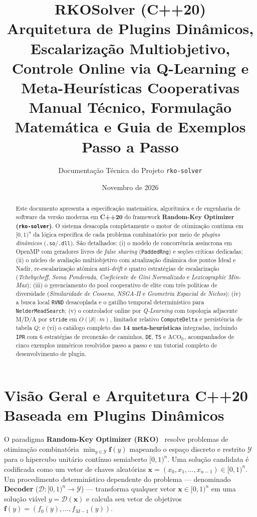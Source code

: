 \documentclass[11pt,a4paper]{article}
\title{%
  \vspace{-1.0cm}
  {\Large\bfseries\color{rkoBlue} RKOSolver (C++20)}\\[0.35cm]
  {\LARGE\bfseries Arquitetura de Plugins Dinâmicos, Escalarização Multiobjetivo,\\
  Controle Online via Q-Learning e Meta-Heurísticas Cooperativas}\\[0.25cm]
  {\normalsize Manual Técnico, Formulação Matemática e Guia de Exemplos Passo a Passo}
}
\author{Documentação Técnica do Projeto \texttt{rko-solver}}
\date{Novembro de 2026}
\begin{document}
\maketitle

\begin{abstract}
Este documento apresenta a especificação matemática, algorítmica e de engenharia de software da versão moderna em \textbf{C++20} do framework \textbf{Random-Key Optimizer (\texttt{rko-solver})}. O sistema desacopla completamente o motor de otimização contínua em $[0,1)^n$ da lógica específica de cada problema combinatório por meio de \emph{plugins dinâmicos} (\texttt{.so}/\texttt{.dll}). São detalhados: (i) o modelo de concorrência assíncrona em OpenMP com geradores livres de \emph{false sharing} (\texttt{PaddedRng}) e seções críticas dedicadas; (ii) o núcleo de avaliação multiobjetivo com atualização dinâmica dos pontos Ideal e Nadir, re-escalarização atômica anti-\emph{drift} e quatro estratégias de escalarização (\emph{Tchebycheff}, \emph{Soma Ponderada}, \emph{Coeficiente de Gini Normalizado} e \emph{Lexicographic Min-Max}); (iii) o gerenciamento do pool cooperativo de elite com três políticas de diversidade (\emph{Similaridade de Cosseno}, \emph{NSGA-II} e \emph{Geometria Espacial de Nichos}); (iv) a busca local \texttt{RVND} desacoplada e o gatilho temporal determinístico para \texttt{NelderMeadSearch}; (v) o controlador online por \emph{Q-Learning} com topologia adjacente M/D/A por \texttt{stride} em $O(|\mathcal{S}|\cdot m)$, limitador relativo \texttt{ComputeDelta} e persistência de tabela $Q$; e (vi) o catálogo completo das \textbf{14 meta-heurísticas} integradas, incluindo \texttt{IPR} com 6 estratégias de reconexão de caminhos, \texttt{DE}, \texttt{TS} e $\text{ACO}_{\mathbb{R}}$, acompanhados de cinco exemplos numéricos resolvidos passo a passo e um tutorial completo de desenvolvimento de plugin.
\end{abstract}

\tableofcontents
\newpage

\section{Visão Geral e Arquitetura C++20 Baseada em Plugins Dinâmicos}
\label{sec:arquitetura}

O paradigma \textbf{Random-Key Optimizer (RKO)}~\cite{chaves2025rko,bean1994rkga} resolve problemas de otimização combinatória $\min_{y \in \mathcal{Y}} \mathbf{f}(y)$ mapeando o espaço discreto e restrito $\mathcal{Y}$ para o hipercubo unitário contínuo semiaberto $[0,1)^n$. Uma solução candidata é codificada como um vetor de chaves aleatórias $\mathbf{x} = (x_0, x_1, \dots, x_{n-1}) \in [0,1)^n$. Um procedimento determinístico dependente do problema --- denominado \textbf{Decoder} ($\mathcal{D}: [0,1)^n \to \mathcal{Y}$) --- transforma qualquer vetor $\mathbf{x} \in [0,1)^n$ em uma solução viável $y = \mathcal{D}(\mathbf{x})$ e calcula seu vetor de objetivos $\mathbf{f}(y) = (f_0(y), \dots, f_{M-1}(y))$.
\end{document}
